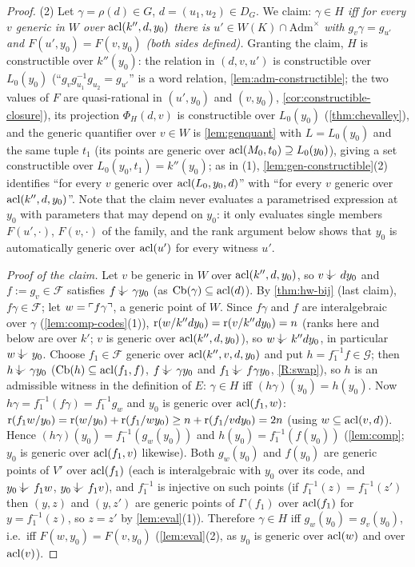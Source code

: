\begin{proof}
(2) Let $\gamma=\rho(d)\in G$, $d=(u_1,u_2)\in D_G$.  We claim: \emph{$\gamma\in H$ iff for
every $v$ generic in $W$ over $\operatorname{acl}(k'',d,y_0)$ there is $u'\in W(K)\cap\mathrm{Adm}^\times$
with $g_v\gamma=g_{u'}$ and $F(u',y_0)=F(v,y_0)$ (both sides defined).}  Granting the claim,
$H$ is constructible over $k''(y_0)$: the relation in $(d,v,u')$ is constructible over
$L_0(y_0)$ (``$g_vg_{u_1}^{-1}g_{u_2}=g_{u'}$'' is a word relation, \cref{lem:adm-constructible};
the two values of $F$ are quasi-rational in $(u',y_0)$ and $(v,y_0)$,
\cref{cor:constructible-closure}), its projection $\Phi_H(d,v)$ is constructible over
$L_0(y_0)$ (\cref{thm:chevalley}), and the generic quantifier over $v\in W$ is
\cref{lem:genquant} with $L=L_0(y_0)$ and the same tuple $t_1$ (its points are generic over
$\operatorname{acl}(M_0,t_0)\supseteq L_0(y_0)$), giving a set constructible over $L_0(y_0,t_1)=k''(y_0)$;
as in (1), \cref{lem:gen-constructible}(2) identifies ``for every $v$ generic over
$\operatorname{acl}(L_0,y_0,d)$'' with ``for every $v$ generic over $\operatorname{acl}(k'',d,y_0)$''.  Note that the claim never evaluates a parametrised expression at $y_0$
with parameters that may depend on $y_0$: it only evaluates single members $F(u',\cdot)$,
$F(v,\cdot)$ of the family, and the rank argument below shows that $y_0$ is automatically
generic over $\operatorname{acl}(u')$ for every witness $u'$.

\emph{Proof of the claim.}  Let $v$ be generic in $W$ over $\operatorname{acl}(k'',d,y_0)$, so $v\ind{}dy_0$
and $f:=g_v\in\mathcal F$ satisfies $f\ind{}\gamma y_0$ (as $\operatorname{Cb}(\gamma)\subseteq\operatorname{acl}(d)$).  By
\cref{thm:hw-bij} (last claim), $f\gamma\in\mathcal F$; let $w=\ulcorner f\gamma\urcorner$, a generic point
of $W$.  Since $f\gamma$ and $f$ are interalgebraic over $\gamma$ (\cref{lem:comp-codes}(1)),
$\operatorname{r}(w/k''dy_0)=\operatorname{r}(v/k''dy_0)=n$ (ranks here and below are over $k'$; $v$ is generic over
$\operatorname{acl}(k'',d,y_0)$), so $w\ind{}k''dy_0$, in particular $w\ind{}y_0$.  Choose $f_1\in\mathcal F$ generic
over $\operatorname{acl}(k'',v,d,y_0)$ and put $h=f_1^{-1}f\in\mathcal G$; then $h\ind{}\gamma y_0$
($\operatorname{Cb}(h)\subseteq\operatorname{acl}(f_1,f)$, $f\ind{}\gamma y_0$ and $f_1\ind{}f\gamma y_0$, \ref{R:swap}), so
$h$ is an admissible witness in the definition of $E$: $\gamma\in H$ iff
$(h\gamma)(y_0)=h(y_0)$.  Now $h\gamma=f_1^{-1}(f\gamma)=f_1^{-1}g_w$ and $y_0$ is generic over
$\operatorname{acl}(f_1,w)$: $\operatorname{r}(f_1w/y_0)=\operatorname{r}(w/y_0)+\operatorname{r}(f_1/wy_0)\ge n+\operatorname{r}(f_1/vdy_0)=2n$ (using
$w\subseteq\operatorname{acl}(v,d)$).  Hence $(h\gamma)(y_0)=f_1^{-1}(g_w(y_0))$ and $h(y_0)=f_1^{-1}(f(y_0))$
(\cref{lem:comp}; $y_0$ is generic over $\operatorname{acl}(f_1,v)$ likewise).  Both $g_w(y_0)$ and
$f(y_0)$ are generic points of $V'$ over $\operatorname{acl}(f_1)$ (each is interalgebraic with $y_0$
over its code, and $y_0\ind{}f_1w$, $y_0\ind{}f_1v$), and $f_1^{-1}$ is injective on such
points (if $f_1^{-1}(z)=f_1^{-1}(z')$ then $(y,z)$ and $(y,z')$ are generic points of
$\Gamma(f_1)$ over $\operatorname{acl}(f_1)$ for $y=f_1^{-1}(z)$, so $z=z'$ by \cref{lem:eval}(1)).  Therefore
$\gamma\in H$ iff $g_w(y_0)=g_v(y_0)$, i.e.\ iff $F(w,y_0)=F(v,y_0)$ (\cref{lem:eval}(2),
as $y_0$ is generic over $\operatorname{acl}(w)$ and over $\operatorname{acl}(v)$).


\end{proof}
